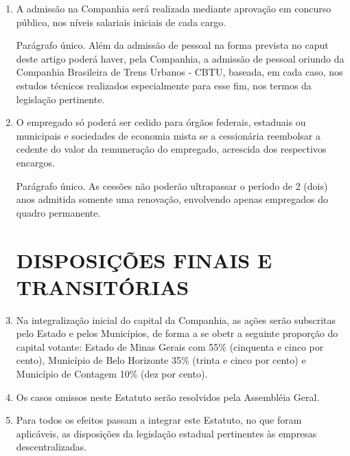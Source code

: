 \documentclass[a4paper,11pt]{report}
\begin{document}
\begin{enumerate}[resume, label=Art. \arabic*]
\item A admissão na Companhia será realizada mediante aprovação em concurso público, nos níveis salariais iniciais de cada cargo.

Parágrafo único. Além da admissão de pessoal na forma prevista no caput deste artigo poderá haver, pela Companhia, a admissão de pessoal oriundo da Companhia Brasileira de Trens Urbanos - CBTU, baseada, em cada caso, nos estudos técnicos realizados especialmente para esse fim, nos termos da legislação pertinente.

\item O empregado só poderá ser cedido para órgãos federais, estaduais ou municipais e sociedades de economia mista se a cessionária reembolsar a cedente do valor da remuneração do empregado, acrescida dos respectivos encargos.

Parágrafo único. As cessões não poderão ultrapassar o período de 2 (dois) anos admitida somente uma renovação, envolvendo apenas empregados do quadro permanente.

\chapter{DISPOSIÇÕES FINAIS E TRANSITÓRIAS}

\item Na integralização inicial do capital da Companhia, as ações serão subscritas pelo Estado e pelos Municípios, de forma a se obetr a seguinte proporção do capital votante: Estado de Minas Gerais com 55\% (cinquenta e cinco por cento), Município de Belo Horizonte 35\% (trinta e cinco por cento) e Município de Contagem 10\% (dez por cento).

\item Os casos omissos neste Estatuto serão resolvidos pela Assembléia Geral.

\item Para todos os efeitos passam a integrar este Estatuto, no que foram aplicáveis, as disposições da legislação estadual pertinentes às empresas descentralizadas.

\end{enumerate}
\end{document}
